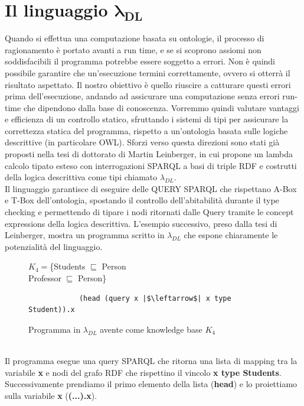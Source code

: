     \section{Il linguaggio $\boldsymbol{\lambda_{DL}}$}
    Quando si effettua una computazione basata su ontologie, il processo di ragionamento è portato avanti a run time, e se si scoprono assiomi non soddisfacibili 
    il programma potrebbe essere soggetto a errori. Non è quindi possibile garantire che un'esecuzione termini correttamente, ovvero si otterrà il risultato aspettato. 
    Il nostro obiettivo è quello riuscire a catturare questi errori prima dell'esecuzione, andando ad assicurare una computazione senza errori run-time che dipendono dalla base di conoscenza. 
    Vorremmo quindi valutare vantaggi e efficienza di un controllo statico, sfruttando i sistemi di tipi per assicurare la correttezza statica del programma, rispetto a 
    un'ontologia basata sulle logiche descrittive (in particolare OWL). Sforzi verso questa direzioni sono stati già proposti nella tesi di dottorato di Martin Leinberger, 
    in cui propone un lambda calcolo tipato esteso con interrogazioni SPARQL a basi di triple RDF e costrutti della logica descrittiva come tipi chiamato $\lambda_{DL}$.
    \\ Il linguaggio garantisce di eseguire delle QUERY SPARQL che rispettano A-Box e T-Box dell'ontologia, spostando il controllo dell'abitabilità durante il type checking e
    permettendo di tipare i nodi ritornati dalle Query tramite le concept expressions della logica descrittiva.
    L'esempio successivo, preso dalla tesi di Leinberger, mostra un programma scritto in $\lambda_{DL}$ che espone chiaramente le potenzialità del linguaggio.
    \begin{figure}[h]
        \captionsetup{singlelinecheck = false}
        $K_4 = $\{Students $\sqsubseteq$ Person
        \\Professor $\sqsubseteq$ Person\}
        \begin{verbatim}
            (head (query x |$\leftarrow$| x type Student)).x
        \end{verbatim}
        \caption{Programma in $\lambda_{DL}$ avente come knowledge base $K_4$}
    \end{figure}
    \\Il programma esegue una query SPARQL che ritorna una lista di mapping tra la variabile \textbf{x} e nodi del grafo RDF che rispettino il vincolo
    \textbf{x type Students}. Successivamente prendiamo il primo elemento della lista (\textbf{head}) e lo proiettiamo sulla variabile \textbf{x} (\textbf{(...).x}).
